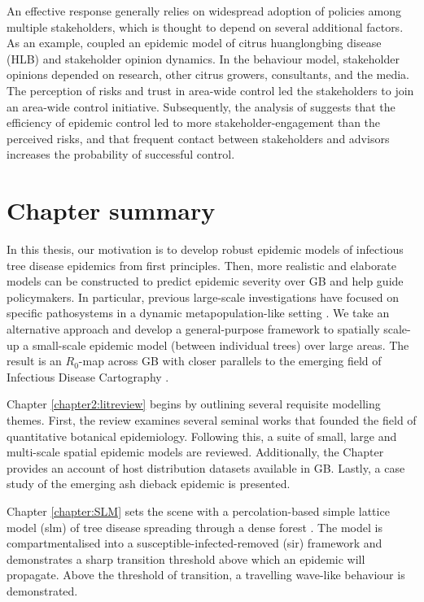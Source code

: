 An effective response generally relies on widespread adoption of policies among multiple 
stakeholders, which is thought to depend on several additional factors. As an example, \cite{milne2020makes} coupled
an epidemic model of citrus huanglongbing disease (HLB) and stakeholder opinion dynamics. In the behaviour model, stakeholder
opinions depended on research, other citrus growers, consultants, and the media. The perception of risks and trust in
area-wide control led the stakeholders to join an area-wide control initiative. Subsequently, the analysis of 
\cite{milne2020makes} suggests that the efficiency of epidemic control led to more stakeholder-engagement than the perceived risks, and that frequent contact between stakeholders and advisors increases the probability of successful control.

\newpage

\section{Chapter summary}

In this thesis, our motivation is to develop robust epidemic models of infectious tree disease
epidemics from first principles. Then, more realistic and elaborate models can be constructed to
predict epidemic severity over GB and help guide policymakers. 
In particular, previous large-scale investigations
have focused on specific pathosystems in a dynamic metapopulation-like setting
\cite{large-scale-control, meentemeyer2011epidemiological, harwood2009epidemiological}. We take
an alternative approach and develop a general-purpose framework to spatially scale-up a small-scale epidemic
model (between individual trees) over large areas. The result is an $R_0$-map across GB with closer parallels
to the emerging field of Infectious Disease Cartography \cite{otieno2021modeling, KRAEMER201619, messina2016mapping}.

Chapter \ref{chapter2:litreview} begins by outlining several requisite modelling themes. First, the review examines
several seminal works that founded the field of quantitative botanical epidemiology. Following this,
a suite of small, large and multi-scale spatial epidemic models are reviewed. Additionally,
the Chapter provides an account of host distribution datasets available in GB. Lastly, a case study of the emerging
ash dieback epidemic is presented.

Chapter \ref{chapter:SLM} sets the scene with a percolation-based simple lattice model (\acrshort{slm}) of tree
disease spreading through a dense forest \cite{OROZCOFUENTES201912}. The model is compartmentalised
into a susceptible-infected-removed (\acrshort{sir}) framework and demonstrates a sharp transition threshold above which an epidemic will propagate. 
Above the threshold of transition, a travelling wave-like behaviour is demonstrated.

